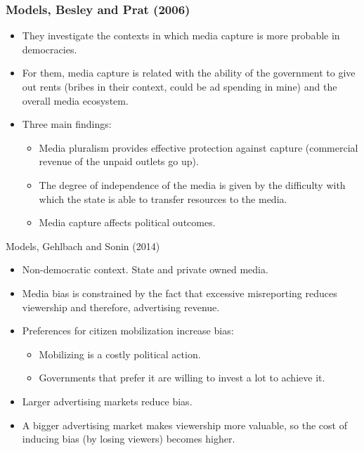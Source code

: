 \documentclass[10pt,aspectratio=169]{beamer}
\begin{document}
\begin{frame}
\frametitle{Models, Besley and Prat (2006)}

\small
\begin{itemize}
\item They investigate the contexts in which media capture is more probable in democracies. 
\item For them, media capture is related with the ability of the government to give out rents (bribes in their context, could be ad spending in mine) and the overall media ecosystem.
\item Three main findings: 
\begin{itemize}
    \item Media pluralism provides effective protection against capture (commercial revenue of the unpaid outlets go up).
    \item The degree of independence of the media is given by the difficulty with which the state is able to transfer resources to the media.
    \item Media capture affects political outcomes. 
\end{itemize}

\end{itemize}
\end{frame}

\begin{frame}{Models, Gehlbach and Sonin (2014)}
\small
\begin{itemize}
    \item Non-democratic context. State and private owned media.
    \item Media bias is constrained by the fact that excessive misreporting reduces viewership and therefore, advertising revenue. 
    \item Preferences for citizen mobilization increase bias: 
    \begin{itemize}
        \item Mobilizing is a costly political action.
        \item Governments that prefer it are willing to invest a lot to achieve it.
    \end{itemize}
    \item Larger advertising markets reduce bias. 
    \item A bigger advertising market makes viewership more valuable, so the cost of inducing bias (by losing viewers) becomes higher.
\end{itemize}
\end{frame}
\end{document}
